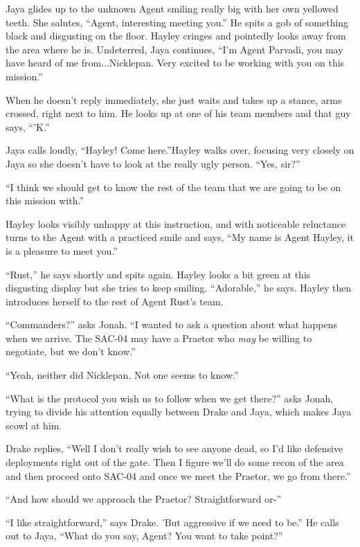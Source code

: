 Jaya glides up to the unknown Agent smiling really big with her own yellowed teeth.  She salutes, ``Agent, interesting meeting you.''  He spits a gob of something black and disgusting on the floor.  Hayley cringes and pointedly looks away from the area where he is.  Undeterred, Jaya continues, ``I'm Agent Parvadi, you may have heard of me from...Nicklepan.  Very excited to be working with you on this mission.''

When he doesn't reply immediately, she just waits and takes up a stance, arms crossed, right next to him.  He looks up at one of his team members and that guy says, ``'K.''

Jaya calls loudly, ``Hayley!  Come here.''Hayley walks over, focusing very closely on Jaya so she doesn't have to look at the really ugly person.  ``Yes, sir?''

``I think we should get to know the rest of the team that we are going to be on this mission with.''

Hayley looks visibly unhappy at this instruction, and with noticeable reluctance turns to the Agent with a practiced smile and says, ``My name is Agent Hayley, it is a pleasure to meet you.''

``Rust,'' he says shortly and spits again.  Hayley looks a bit green at this disgusting display but she tries to keep smiling.  ``Adorable,'' he says.  Hayley then introduces herself to the rest of Agent Rust's team.

``Commanders?'' asks Jonah.  ``I wanted to ask a question about what happens when we arrive.  The SAC-04 may have a Praetor who \textit{may} be willing to negotiate, but we don't know.''

``Yeah, neither did Nicklepan.  Not one seems to know.''

``What is the protocol you wish us to follow when we get there?'' asks Jonah, trying to divide his attention equally between Drake and Jaya, which makes Jaya scowl at him.

Drake replies, ``Well I don't really wish to see anyone dead, so I'd like defensive deployments right out of the gate.  Then I figure we'll do some recon of the area and then proceed onto SAC-04 and once we meet the Praetor, we go from there.''

``And how should we approach the Praetor?  Straightforward or-''

``I like straightforward,'' says Drake.  'But aggressive if we need to be.''  He calls out to Jaya, ``What do you say, Agent?  You want to take point?''

